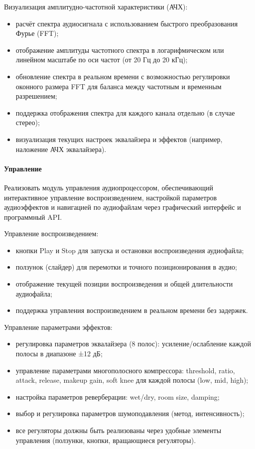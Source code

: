 Визуализация амплитудно-частотной характеристики (АЧХ):
\begin{itemize}
	\item расчёт спектра аудиосигнала с использованием быстрого преобразования Фурье (FFT);
	\item отображение амплитуды частотного спектра в логарифмическом или линейном масштабе по оси частот (от 20 Гц до 20 кГц);
	\item обновление спектра в реальном времени с возможностью регулировки оконного размера FFT для баланса между частотным и временным разрешением;
	\item поддержка отображения спектра для каждого канала отдельно (в случае стерео);
	\item визуализация текущих настроек эквалайзера и эффектов (например, наложение АЧХ эквалайзера).
\end{itemize}

\paragraph{Управление}

Реализовать модуль управления аудиопроцессором, обеспечивающий интерактивное управление воспроизведением, настройкой параметров аудиоэффектов и навигацией по аудиофайлам через графический интерфейс и программный API.

Управление воспроизведением:
\begin{itemize}
	\item кнопки Play и Stop для запуска и остановки воспроизведения аудиофайла;
	\item ползунок (слайдер) для перемотки и точного позиционирования в аудио;
	\item отображение текущей позиции воспроизведения и общей длительности аудиофайла;
	\item поддержка управления воспроизведением в реальном времени без задержек.
\end{itemize}

Управление параметрами эффектов:
\begin{itemize}
	\item регулировка параметров эквалайзера (8 полос): усиление/ослабление каждой полосы в диапазоне ±12 дБ;
	\item управление параметрами многополосного компрессора: threshold, ratio, attack, release, makeup gain, soft knee для каждой полосы (low, mid, high);
	\item настройка параметров реверберации: wet/dry, room size, damping;
	\item выбор и регулировка параметров шумоподавления (метод, интенсивность);
	\item все регуляторы должны быть реализованы через удобные элементы управления (ползунки, кнопки, вращающиеся регуляторы).
\end{itemize}


